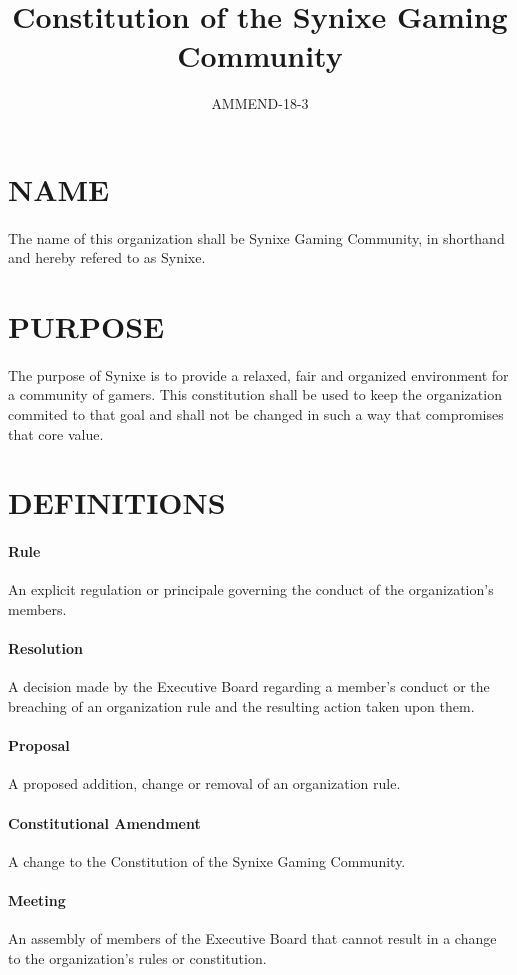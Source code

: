 \documentclass[10pt,a4paper]{article}
\title{Constitution of the Synixe Gaming Community}
\date{AMMEND-18-3}
\begin{document}
\maketitle
\newpage
\section{NAME}
\paragraph{}
The name of this organization shall be Synixe Gaming Community, in shorthand and hereby refered to as Synixe.
\section{PURPOSE}
\paragraph{}
The purpose of Synixe is to provide a relaxed, fair and organized environment for a community of gamers. This constitution shall be used to keep the organization commited to that goal and shall not be changed in such a way that compromises that core value.
\section{DEFINITIONS}
\paragraph{Rule} An explicit regulation or principale governing the conduct of the organization's members.
\paragraph{Resolution} A decision made by the Executive Board regarding a member's conduct or the breaching of an organization rule and the resulting action taken upon them.
\paragraph{Proposal} A proposed addition, change or removal of an organization rule.
\paragraph{Constitutional Amendment} A change to the Constitution of the Synixe Gaming Community.
\paragraph{Meeting} An assembly of members of the Executive Board that cannot result in a change to the organization's rules or constitution.
\end{document}
